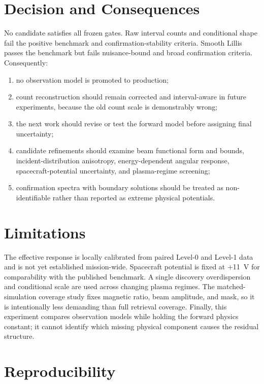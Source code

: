 \documentclass[11pt]{article}
\begin{document}
\section{Decision and Consequences}

No candidate satisfies all frozen gates.  Raw interval counts and conditional
shape fail the positive benchmark and confirmation-stability criteria.  Smooth
Lillis passes the benchmark but fails nuisance-bound and broad confirmation
criteria.  Consequently:
\begin{enumerate}
  \item no observation model is promoted to production;
  \item count reconstruction should remain corrected and interval-aware in
  future experiments, because the old count scale is demonstrably wrong;
  \item the next work should revise or test the forward model before assigning
  final uncertainty;
  \item candidate refinements should examine beam functional form and bounds,
  incident-distribution anisotropy, energy-dependent angular response,
  spacecraft-potential uncertainty, and plasma-regime screening;
  \item confirmation spectra with boundary solutions should be treated as
  non-identifiable rather than reported as extreme physical potentials.
\end{enumerate}

\section{Limitations}

The effective response is locally calibrated from paired Level-0 and Level-1
data and is not yet established mission-wide.  Spacecraft potential is fixed at
+11~V for comparability with the published benchmark.  A single discovery
overdispersion and conditional scale are used across changing plasma regimes.
The matched-simulation coverage study fixes magnetic ratio, beam amplitude, and
mask, so it is intentionally less demanding than full retrieval coverage.
Finally, this experiment compares observation models while holding the forward
physics constant; it cannot identify which missing physical component causes
the residual structure.

\section{Reproducibility}
\end{document}
